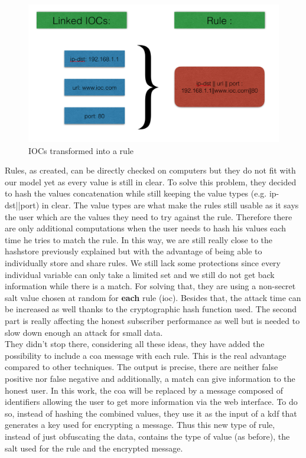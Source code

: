 \documentclass{eplmastersthesis}
\begin{document}
\begin{figure}[h!]
\begin{center}
	\includegraphics[scale=0.5]{res/ioc-rules}
	\caption{IOCs transformed into a rule}
	\label{IOC-To-Rule}
\end{center}
\end{figure}

Rules, as created, can be directly checked on computers but they do not fit with our model yet as every value is still in clear. To solve this problem, they decided to hash the values concatenation while still keeping the value types (e.g. ip-dst||port) in clear.
The value types are what make the rules still usable as it says the user which are the values they need to try against the rule.
Therefore there are only additional computations when the user needs to hash his values each time he tries to match the rule.
In this way, we are still really close to the hashstore previously explained but with the advantage of being able to individually store and share rules. We still lack some protections since every individual variable can only take a limited set and we still do not get back information while there is a match.
For solving that, they are using a non-secret salt value chosen at random for \textbf{each} rule (\gls{ioc}). Besides that, the attack time can be increased as well thanks to the cryptographic hash function used. The second part is really affecting the honest subscriber performance as well but is needed to slow down enough an attack for small data.\\

They didn't stop there, considering all these ideas, they have added the possibility to include a \gls{coa} message with each rule. This is the real advantage compared to other techniques. The output is precise, there are neither false positive nor false negative and additionally, a match can give information to the honest user. In this work, the \gls{coa} will be replaced by a message composed of identifiers allowing the user to get more information via the web interface. To do so, instead of hashing the combined values, they use it as the input of a \gls{kdf} that generates a key used for encrypting a message.
Thus this new type of rule, instead of just obfuscating the data, contains the type of value (as before), the salt used for the rule and the encrypted message.\\
\end{document}
